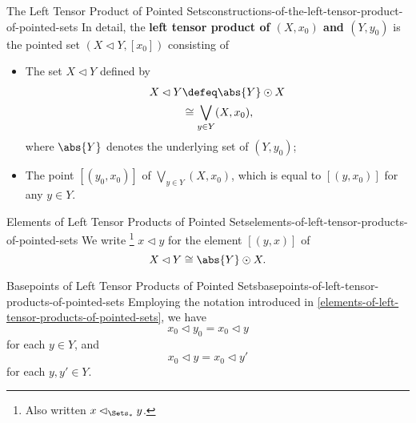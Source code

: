 \begin{construction}{The Left Tensor Product of Pointed Sets}{constructions-of-the-left-tensor-product-of-pointed-sets}%
    In detail, the \textbf{left tensor product of $(X,x_{0})$ and $(Y,y_{0})$} is the pointed set $(X\lhd Y,[x_{0}])$ consisting of%
    \begin{itemize}
        \item{}The set $X\lhd Y$ defined by
            \begin{align*}
                X\lhd Y &\defeq \abs{Y}\odot X\\
                        &\cong  \bigvee_{y\in Y}(X,x_{0}),
            \end{align*}
            where $\abs{Y}$ denotes the underlying set of $(Y,y_{0})$;
        \item{}The point $[(y_{0},x_{0})]$ of $\bigvee_{y\in Y}(X,x_{0})$, which is equal to $[(y,x_{0})]$ for any $y\in Y$.
    \end{itemize}
\end{construction}
\begin{notation}{Elements of Left Tensor Products of Pointed Sets}{elements-of-left-tensor-products-of-pointed-sets}%
    We write%
    \footnote{%
        Also written $x\lhd_{\Sets_{*}}y$.
        \par\vspace*{\TCBBoxCorrection}
    } %
    $x\lhd y$ for the element $[(y,x)]$ of
    \[
        X\lhd Y%
        \cong%
        \abs{Y}\odot X.%
    \]%
\end{notation}
\begin{remark}{Basepoints of Left Tensor Products of Pointed Sets}{basepoints-of-left-tensor-products-of-pointed-sets}%
    Employing the notation introduced in \cref{elements-of-left-tensor-products-of-pointed-sets}, we have
    \[
        x_{0}\lhd y_{0}%
        =%
        x_{0}\lhd y%
    \]%
    for each $y\in Y$, and
    \[
        x_{0}\lhd y%
        =%
        x_{0}\lhd y'%
    \]%
    for each $y,y'\in Y$.
\end{remark}
